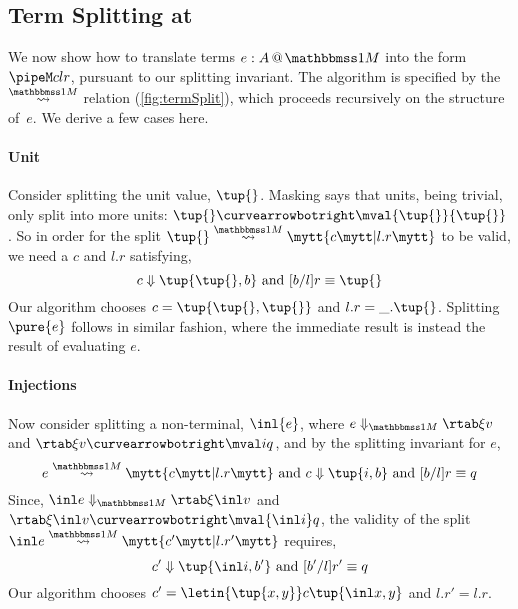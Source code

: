 \begin{abstrsyn}



\subsection{Term Splitting at \bbonem}
\label{sec:split-one}

We now show how to translate terms $\colmix e A$ into the form $\pipeM c l r$,
pursuant to our splitting invariant.
The algorithm is specified by the $\splitonesym$ relation (\cref{fig:termSplit}), 
which proceeds recursively on the structure of~$e$. We derive a few cases here.

\paragraph {Unit} 
Consider splitting the unit value, $\tup{}$.
Masking says that units, being trivial, only split into more units: $\tup{} \vsplito \mval {\tup{}} {\tup{}}$.
So in order for the split $\splitone {\tup {}} A c {l.r}$ to be valid, 
we need a $c$ and $l.r$ satisfying,
\[
	\reduce c {\tup{\tup{},b}} \text{ and } [b/l]r \equiv \tup{}
\]
Our algorithm chooses $c=\tup{\tup{},\tup{}}$ and $l.r = \_.\tup{}$.
Splitting $\pure{e}$ follows in similar fashion, 
where the immediate result is instead the result of evaluating $e$.

\paragraph {Injections} 
Now consider splitting a non-terminal, $\inl {e}$,
where $\diaone {e} \xi v$ and $\rtab \xi v \vsplito \mval i q$, 
and by the splitting invariant for $e$,
\[
	\splitone e A c {l.r} \text{ and } \reduce c {\tup{i,b}} \text{ and } [b/l]r \equiv q
\]
Since, $\diaone {\inl e} \xi {\inl v}$ and $\rtab \xi {\inl v} \vsplito \mval {\inl i} q$,
the validity of the split $\splitone {\inl e} A {c'} {l.r'}$ requires,
\[
	\reduce {c'} {\tup{\inl i,b'}} \text{ and } [b'/l]r' \equiv q
\]
Our algorithm chooses $c' = \letin {\tup {x,y}} c {\tup{\inl x, y}}$ and $l.r' = l.r$.


\end{abstrsyn}
